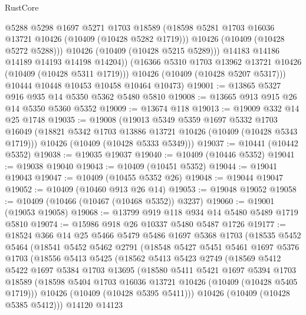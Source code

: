 \begin{lexlean}{RustCore}
\begin{coremodule}
                @5288
                @5298
                @1697
                @5271
                @1703
                @18589
                (@18598 @5281 @1703 @16036 @13721 @10426 (@10409 (@10428 @5282 @1719)))
                @10426
                (@10409 (@10428 @5272 @5288)))
              @10426
              (@10409 (@10428 @5215 @5289)))
            @14183
            @14186
            @14189
            @14193
            @14198
            @14204))
        (@16366 @5310 @1703 @13962 @13721 @10426 (@10409 (@10428 @5311 @1719)))
        @10426
        (@10409 (@10428 @5207 @5317)))
      @10444
      @10448
      @10453
      @10458
      @10464
      @10473)
@19001 := @13865 @5327 @916 @935 @14 @5350 @5362 @5480 @5810
@19008 := @13665 @913 @915 @26 @14 @5350 @5360 @5352
@19009 := @13674 @118
@19013 := @19009 @332 @14 @25 @1748
@19035 := @19008
    (@19013
      @5349
      @5359
      @1697
      @5332
      @1703
      @16049
      (@18821 @5342 @1703 @13886 @13721 @10426 (@10409 (@10428 @5343 @1719)))
      @10426
      (@10409 (@10428 @5333 @5349)))
@19037 := @10441 (@10442 @5352)
@19038 := @19035 @19037
@19040 := @10409 (@10446 @5352)
@19041 := @19038 @19040
@19043 := @10409 (@10451 @5352)
@19044 := @19041 @19043
@19047 := @10409 (@10455 @5352 @26)
@19048 := @19044 @19047
@19052 := @10409 (@10460 @913 @26 @14)
@19053 := @19048 @19052
@19058 := @10409 (@10466 (@10467 (@10468 @5352)) @3237)
@19060 := @19001 (@19053 @19058)
@19068 := @13799 @919 @118 @934 @14 @5480 @5489 @1719 @5810
@19074 := @15986 @918 @26 @10337 @5480 @5487 @1726
@19177 := @18524
    @366
    @14
    @25
    @5466
    @5479
    @5486
    @1697
    @5368
    @1703
    (@18535
      @5452
      @5464
      (@18541
        @5452
        @5462
        @2791
        (@18548
          @5427
          @5451
          @5461
          @1697
          @5376
          @1703
          (@18556
            @5413
            @5425
            (@18562
              @5413
              @5423
              @2749
              (@18569
                @5412
                @5422
                @1697
                @5384
                @1703
                @13695
                (@18580
                  @5411
                  @5421
                  @1697
                  @5394
                  @1703
                  @18589
                  (@18598 @5404 @1703 @16036 @13721 @10426 (@10409 (@10428 @5405 @1719)))
                  @10426
                  (@10409 (@10428 @5395 @5411)))
                @10426
                (@10409 (@10428 @5385 @5412)))
              @14120
              @14123

\end{coremodule}
\end{lexlean}
